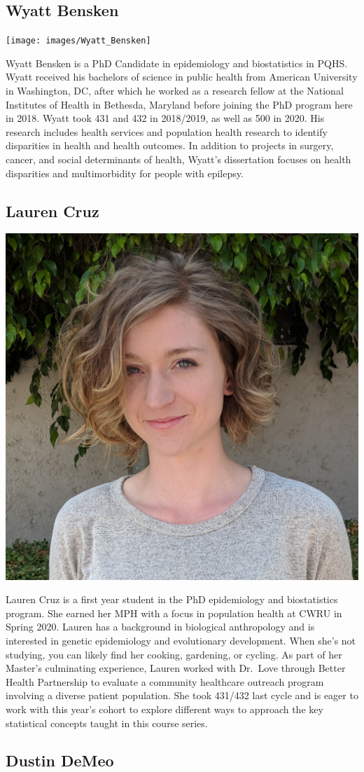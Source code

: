 \documentclass[
]{book}
\begin{document}
\hypertarget{wyatt-bensken}{%
\subsection{Wyatt Bensken}\label{wyatt-bensken}}

\texttt{[image: images/Wyatt\_Bensken]}

Wyatt Bensken is a PhD Candidate in epidemiology and biostatistics in PQHS. Wyatt received his bachelors of science in public health from American University in Washington, DC, after which he worked as a research fellow at the National Institutes of Health in Bethesda, Maryland before joining the PhD program here in 2018. Wyatt took 431 and 432 in 2018/2019, as well as 500 in 2020. His research includes health services and population health research to identify disparities in health and health outcomes. In addition to projects in surgery, cancer, and social determinants of health, Wyatt's dissertation focuses on health disparities and multimorbidity for people with epilepsy.

\hypertarget{lauren-cruz}{%
\subsection{Lauren Cruz}\label{lauren-cruz}}

\includegraphics[width=0.2\linewidth]{images/Lauren_Cruz}

Lauren Cruz is a first year student in the PhD epidemiology and biostatistics program. She earned her MPH with a focus in population health at CWRU in Spring 2020. Lauren has a background in biological anthropology and is interested in genetic epidemiology and evolutionary development. When she's not studying, you can likely find her cooking, gardening, or cycling. As part of her Master's culminating experience, Lauren worked with Dr.~Love through Better Health Partnership to evaluate a community healthcare outreach program involving a diverse patient population. She took 431/432 last cycle and is eager to work with this year's cohort to explore different ways to approach the key statistical concepts taught in this course series.

\hypertarget{dustin-demeo}{%
\subsection{Dustin DeMeo}\label{dustin-demeo}}
\end{document}
